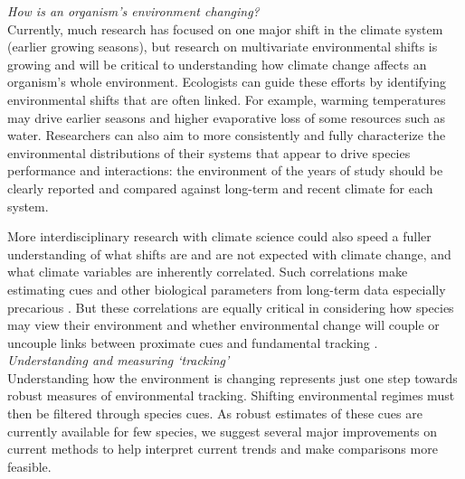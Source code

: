 \documentclass[11pt,letterpaper]{article}
\newcommand{\R}[1]{\label{#1}\linelabel{#1}}
\begin{document}
\emph{How is an organism's environment changing?} \\ 
Currently, much research has focused on one major shift in the climate system (earlier growing seasons), but research on multivariate environmental shifts is growing and will be critical to understanding how climate change affects an organism's whole environment. Ecologists can guide these efforts by identifying environmental shifts that are often linked. \R{r3misc5}For example, warming temperatures may drive earlier seasons and higher evaporative loss of some resources such as water. Researchers can also aim to more consistently and fully characterize the environmental distributions of their systems that appear to drive species performance and interactions: the environment of the years of study should be clearly reported and compared against long-term and recent climate for each system. 

More interdisciplinary research with climate science could also speed a fuller understanding of what shifts are and are not expected with climate change, and what climate variables are inherently correlated. Such correlations make estimating cues and other biological parameters from long-term data especially precarious \citep{tansey2017}. But these correlations are equally critical in considering how species may view their environment and whether environmental change will couple or uncouple links between proximate cues and fundamental tracking \citep{bonamour2019}. \\

\emph{Understanding and measuring `tracking'} \\
Understanding how the environment is changing represents just one step towards robust measures of environmental tracking. Shifting environmental regimes must then be filtered through species cues. As robust estimates of these cues are currently available for few species, we suggest several major improvements on current methods to help interpret current trends and make comparisons more feasible. 
\end{document}
